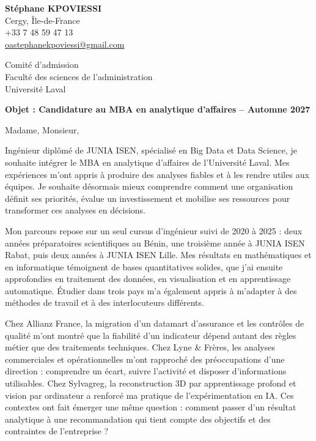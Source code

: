 \documentclass[12pt,a4paper]{article}
\begin{document}
\thispagestyle{empty}
\textbf{Stéphane KPOVIESSI}\\
{\small Cergy, Île-de-France\\
+33 7 48 59 47 13\\
\href{mailto:oastephanekpoviessi@gmail.com}{oastephanekpoviessi@gmail.com}}

\vspace{0.4em}
Comité d'admission\\
Faculté des sciences de l'administration\\
Université Laval

\vspace{0.3em}
\textbf{Objet : Candidature au MBA en analytique d'affaires -- Automne 2027}

Madame, Monsieur,

Ingénieur diplômé de JUNIA ISEN, spécialisé en Big Data et Data Science, je souhaite intégrer le MBA en analytique d'affaires de l'Université Laval. Mes expériences m'ont appris à produire des analyses fiables et à les rendre utiles aux équipes. Je souhaite désormais mieux comprendre comment une organisation définit ses priorités, évalue un investissement et mobilise ses ressources pour transformer ces analyses en décisions.

Mon parcours repose sur un seul cursus d'ingénieur suivi de 2020 à 2025 : deux années préparatoires scientifiques au Bénin, une troisième année à JUNIA ISEN Rabat, puis deux années à JUNIA ISEN Lille. Mes résultats en mathématiques et en informatique témoignent de bases quantitatives solides, que j'ai ensuite approfondies en traitement des données, en visualisation et en apprentissage automatique. Étudier dans trois pays m'a également appris à m'adapter à des méthodes de travail et à des interlocuteurs différents.

Chez Allianz France, la migration d'un datamart d'assurance et les contrôles de qualité m'ont montré que la fiabilité d'un indicateur dépend autant des règles métier que des traitements techniques. Chez Lyne \& Frères, les analyses commerciales et opérationnelles m'ont rapproché des préoccupations d'une direction : comprendre un écart, suivre l'activité et disposer d'informations utilisables. Chez Sylvagreg, la reconstruction 3D par apprentissage profond et vision par ordinateur a renforcé ma pratique de l'expérimentation en IA. Ces contextes ont fait émerger une même question : comment passer d'un résultat analytique à une recommandation qui tient compte des objectifs et des contraintes de l'entreprise ?
\end{document}
